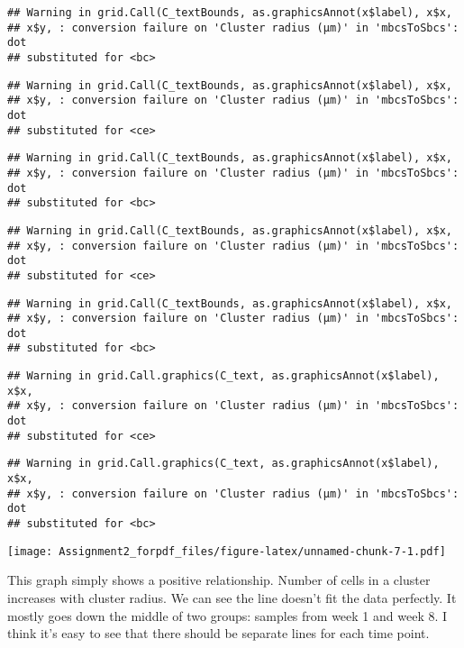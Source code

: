 \documentclass[]{article}
\begin{document}
\begin{verbatim}
## Warning in grid.Call(C_textBounds, as.graphicsAnnot(x$label), x$x,
## x$y, : conversion failure on 'Cluster radius (μm)' in 'mbcsToSbcs': dot
## substituted for <bc>
\end{verbatim}

\begin{verbatim}
## Warning in grid.Call(C_textBounds, as.graphicsAnnot(x$label), x$x,
## x$y, : conversion failure on 'Cluster radius (μm)' in 'mbcsToSbcs': dot
## substituted for <ce>
\end{verbatim}

\begin{verbatim}
## Warning in grid.Call(C_textBounds, as.graphicsAnnot(x$label), x$x,
## x$y, : conversion failure on 'Cluster radius (μm)' in 'mbcsToSbcs': dot
## substituted for <bc>
\end{verbatim}

\begin{verbatim}
## Warning in grid.Call(C_textBounds, as.graphicsAnnot(x$label), x$x,
## x$y, : conversion failure on 'Cluster radius (μm)' in 'mbcsToSbcs': dot
## substituted for <ce>
\end{verbatim}

\begin{verbatim}
## Warning in grid.Call(C_textBounds, as.graphicsAnnot(x$label), x$x,
## x$y, : conversion failure on 'Cluster radius (μm)' in 'mbcsToSbcs': dot
## substituted for <bc>
\end{verbatim}

\begin{verbatim}
## Warning in grid.Call.graphics(C_text, as.graphicsAnnot(x$label), x$x,
## x$y, : conversion failure on 'Cluster radius (μm)' in 'mbcsToSbcs': dot
## substituted for <ce>
\end{verbatim}

\begin{verbatim}
## Warning in grid.Call.graphics(C_text, as.graphicsAnnot(x$label), x$x,
## x$y, : conversion failure on 'Cluster radius (μm)' in 'mbcsToSbcs': dot
## substituted for <bc>
\end{verbatim}

\texttt{[image: Assignment2\_forpdf\_files/figure-latex/unnamed-chunk-7-1.pdf]}

This graph simply shows a positive relationship. Number of cells in a
cluster increases with cluster radius. We can see the line doesn't fit
the data perfectly. It mostly goes down the middle of two groups:
samples from week 1 and week 8. I think it's easy to see that there
should be separate lines for each time point.
\end{document}

